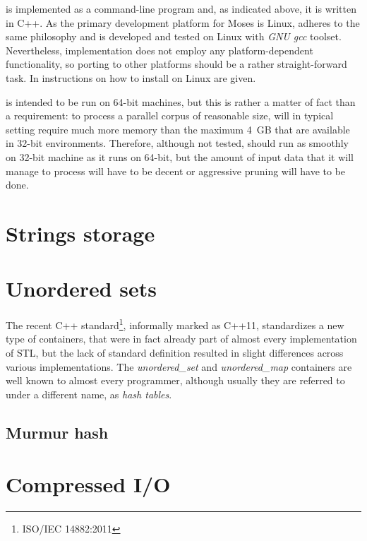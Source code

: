
\Eppex{} is implemented as a command-line program and, as indicated above, it is written in C++.
As the primary development platform for Moses is Linux,
\eppex{} adheres to the same philosophy and is developed and tested on Linux with \emph{GNU gcc}
toolset.
Nevertheless, \eppex{} implementation does not employ any platform-dependent functionality,
so porting to other platforms should be a rather straight-forward task.
In  instructions on how to install \eppex{} on Linux are given.

\Eppex{} is intended to be run on 64-bit machines, but this is rather a matter of fact than
a requirement: to process a parallel corpus of reasonable size, \eppex{} will in typical
setting require much more memory than the maximum 4~GB that are available in 32-bit environments.
Therefore, although not tested, \eppex{} should run as smoothly on 32-bit machine as it runs
on 64-bit, but the amount of input data that it will manage to process will have to be decent
or aggressive pruning will have to be done.

\section{Strings storage}

\section{Unordered sets}

The recent C++ standard\footnote{ISO/IEC 14882:2011}, informally marked as C++11, standardizes
a new type of containers, that were in fact already part of almost every implementation of STL,
but the lack of standard definition resulted in slight differences across various implementations.
The \emph{unordered_set} and \emph{unordered_map} containers are well known to almost every
programmer, although usually they are referred to under a different name, as \emph{hash tables}.

\subsection{Murmur hash}

\section{Compressed I/O}
